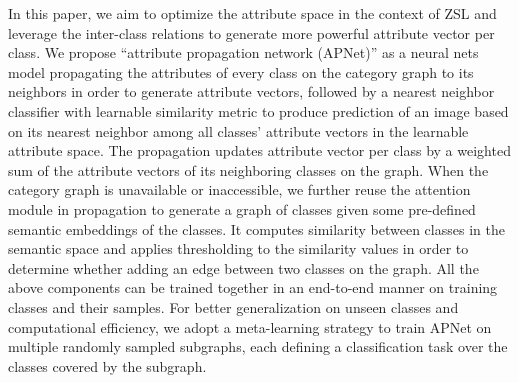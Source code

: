 \documentclass[letterpaper]{article} %
\begin{document}
In this paper, we aim to optimize the attribute space in the context of ZSL and leverage the inter-class relations to generate more powerful attribute vector per  class. We propose ``attribute propagation network (APNet)'' as a neural nets model propagating the attributes of every class on the category graph to its neighbors in order to generate attribute vectors, followed by a nearest neighbor classifier with learnable similarity metric to produce prediction of an image based on its nearest neighbor among all classes' attribute vectors in the learnable attribute space. The propagation updates attribute vector per class by a weighted sum of the attribute vectors of its neighboring classes on the graph.
When the category graph is unavailable or inaccessible, we further reuse the attention module in propagation to generate a graph of classes given some pre-defined semantic embeddings of the classes. It computes similarity between classes in the semantic space and applies  thresholding to the similarity values in order to determine whether adding an edge between two classes on the graph. 
All the above components can be trained together in an end-to-end manner on training classes and their samples. 
For better generalization on unseen classes and computational efficiency, 
we adopt a meta-learning strategy to train APNet on multiple randomly sampled subgraphs, each defining a classification task over the classes covered by the subgraph. 
\end{document}
